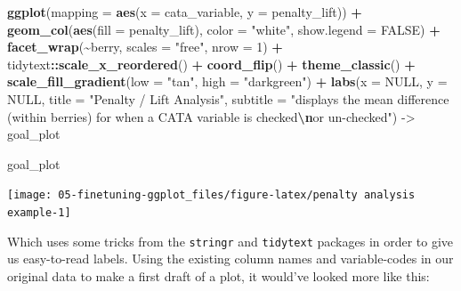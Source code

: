 \documentclass[
]{book}
\newenvironment{Shaded}{\begin{snugshade}}{\end{snugshade}}
\newcommand{\AttributeTok}[1]{\textcolor[rgb]{0.13,0.29,0.53}{#1}}
\newcommand{\ConstantTok}[1]{\textcolor[rgb]{0.56,0.35,0.01}{#1}}
\newcommand{\DecValTok}[1]{\textcolor[rgb]{0.00,0.00,0.81}{#1}}
\newcommand{\FunctionTok}[1]{\textcolor[rgb]{0.13,0.29,0.53}{\textbf{#1}}}
\newcommand{\NormalTok}[1]{#1}
\newcommand{\OtherTok}[1]{\textcolor[rgb]{0.56,0.35,0.01}{#1}}
\newcommand{\SpecialCharTok}[1]{\textcolor[rgb]{0.81,0.36,0.00}{\textbf{#1}}}
\newcommand{\StringTok}[1]{\textcolor[rgb]{0.31,0.60,0.02}{#1}}
\begin{document}
\begin{Shaded}
\begin{Highlighting}[]
  \FunctionTok{ggplot}\NormalTok{(}\AttributeTok{mapping =} \FunctionTok{aes}\NormalTok{(}\AttributeTok{x =}\NormalTok{ cata\_variable, }\AttributeTok{y =}\NormalTok{ penalty\_lift)) }\SpecialCharTok{+}
  \FunctionTok{geom\_col}\NormalTok{(}\FunctionTok{aes}\NormalTok{(}\AttributeTok{fill =}\NormalTok{ penalty\_lift), }\AttributeTok{color =} \StringTok{"white"}\NormalTok{, }\AttributeTok{show.legend =} \ConstantTok{FALSE}\NormalTok{) }\SpecialCharTok{+} 
  \FunctionTok{facet\_wrap}\NormalTok{(}\SpecialCharTok{\textasciitilde{}}\NormalTok{berry, }\AttributeTok{scales =} \StringTok{"free"}\NormalTok{, }\AttributeTok{nrow =} \DecValTok{1}\NormalTok{) }\SpecialCharTok{+} 
\NormalTok{  tidytext}\SpecialCharTok{::}\FunctionTok{scale\_x\_reordered}\NormalTok{() }\SpecialCharTok{+} 
  \FunctionTok{coord\_flip}\NormalTok{() }\SpecialCharTok{+} 
  \FunctionTok{theme\_classic}\NormalTok{() }\SpecialCharTok{+} 
  \FunctionTok{scale\_fill\_gradient}\NormalTok{(}\AttributeTok{low =} \StringTok{"tan"}\NormalTok{, }\AttributeTok{high =} \StringTok{"darkgreen"}\NormalTok{) }\SpecialCharTok{+} 
  \FunctionTok{labs}\NormalTok{(}\AttributeTok{x =} \ConstantTok{NULL}\NormalTok{, }\AttributeTok{y =} \ConstantTok{NULL}\NormalTok{,}
       \AttributeTok{title =} \StringTok{"Penalty / Lift Analysis"}\NormalTok{,}
       \AttributeTok{subtitle =} \StringTok{"displays the mean difference (within berries) for when a CATA variable is checked}\SpecialCharTok{\textbackslash{}n}\StringTok{or un{-}checked"}\NormalTok{) }\OtherTok{{-}\textgreater{}}
\NormalTok{  goal\_plot}

\NormalTok{goal\_plot}
\end{Highlighting}
\end{Shaded}

\begin{center}\texttt{[image: 05-finetuning-ggplot\_files/figure-latex/penalty analysis example-1]} \end{center}

Which uses some tricks from the \texttt{stringr} and \texttt{tidytext} packages in order to give us easy-to-read labels. Using the existing column names and variable-codes in our original data to make a first draft of a plot, it would've looked more like this:
\end{document}

